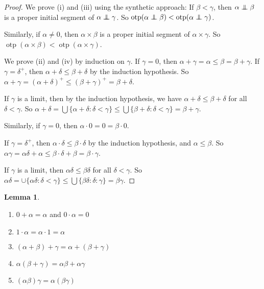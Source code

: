 \documentclass[a4paper]{article}
\theoremstyle{definition}
\newtheorem*{lemma}{Lemma}
\newcommand{\oadd}{\mathrel\bot\joinrel\mspace{-8mu}\mathrel\bot}
\DeclareMathOperator\otp{otp}
\begin{document}
\begin{proof}
  We prove (i) and (iii) using the synthetic approach: If $\beta < \gamma$, then $\alpha\oadd \beta$ is a proper initial segment of $\alpha\oadd \gamma$. So $\otp(\alpha\oadd \beta) < \otp (\alpha\oadd \gamma)$.

Similarly, if $\alpha\not= 0$, then $\alpha\times \beta$ is a proper initial segment of $\alpha\times\gamma$. So $\otp(\alpha\times \beta) < \otp(\alpha\times\gamma)$.

We prove (ii) and (iv) by induction on $\gamma$. If $\gamma = 0$, then $\alpha + \gamma = \alpha \leq \beta = \beta + \gamma$. If $\gamma = \delta^+$, then $\alpha + \delta \leq \beta + \delta$ by the induction hypothesis. So $\alpha + \gamma = (\alpha + \delta)^+ \leq (\beta + \gamma)^+ = \beta + \delta$.

If $\gamma$ is a limit, then by the induction hypothesis, we have $\alpha + \delta \leq \beta + \delta$ for all $\delta < \gamma$. So $\alpha + \delta = \bigcup\{\alpha + \delta: \delta < \gamma\} \leq \bigcup \{\beta + \delta : \delta < \gamma\} = \beta + \gamma$.

Similarly, if $\gamma = 0$, then $\alpha\cdot 0 = 0 = \beta \cdot 0$.

If $\gamma = \delta^+$, then $\alpha\cdot \delta \leq \beta\cdot \delta$ by the induction hypothesis, and $\alpha \leq \beta$. So $\alpha\gamma = \alpha\delta + \alpha \leq \beta\cdot \delta + \beta = \beta\cdot \gamma$.

If $\gamma$ is a limit, then $\alpha\delta \leq \beta\delta$ for all $\delta < \gamma$. So $\alpha\delta = \cup \{\alpha\delta: \delta < \gamma\} \leq \bigcup \{\beta\delta: \delta: \gamma\} = \beta\gamma$.
\end{proof}

\begin{lemma}
  \begin{enumerate}
  \item $0 + \alpha = \alpha$ and $0\cdot \alpha = 0$
  \item $1\cdot \alpha = \alpha\cdot 1 = \alpha$
  \item $(\alpha + \beta) + \gamma = \alpha + (\beta + \gamma)$
  \item $\alpha(\beta + \gamma) = \alpha\beta + \alpha\gamma$
  \item $(\alpha\beta)\gamma = \alpha(\beta\gamma)$
  \end{enumerate}
\end{lemma}
\end{document}
